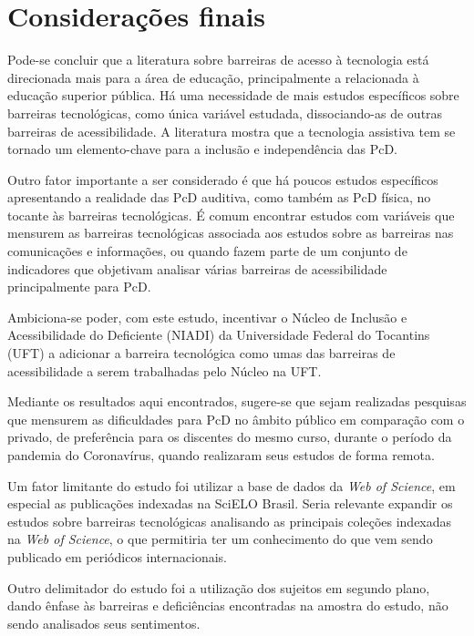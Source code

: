 \documentclass{textolivre}
\begin{document}
\section{Considerações finais}
Pode-se concluir que a literatura sobre barreiras de acesso à tecnologia está direcionada mais para a área de educação, principalmente a relacionada à educação superior pública. Há uma necessidade de mais estudos específicos sobre barreiras tecnológicas, como única variável estudada, dissociando-as de outras barreiras de acessibilidade. A literatura mostra que a tecnologia assistiva tem se tornado um elemento-chave para a inclusão e independência das PcD.

Outro fator importante a ser considerado é que há poucos estudos específicos apresentando a realidade das PcD auditiva, como também as PcD física, no tocante às barreiras tecnológicas. É comum encontrar estudos com variáveis que mensurem as barreiras tecnológicas associada aos estudos sobre as barreiras nas comunicações e informações, ou quando fazem parte de um conjunto de indicadores que objetivam analisar várias barreiras de acessibilidade principalmente para PcD.

Ambiciona-se poder, com este estudo, incentivar o Núcleo de Inclusão e Acessibilidade do Deficiente (NIADI) da Universidade Federal do Tocantins (UFT) a adicionar a barreira tecnológica como umas das barreiras de acessibilidade a serem trabalhadas pelo Núcleo na UFT.

Mediante os resultados aqui encontrados, sugere-se que sejam realizadas pesquisas que mensurem as dificuldades para PcD no âmbito público em comparação com o privado, de preferência para os discentes do mesmo curso, durante o período da pandemia do Coronavírus, quando realizaram seus estudos de forma remota.

Um fator limitante do estudo foi utilizar a base de dados da \emph{Web of Science}, em especial as publicações indexadas na SciELO Brasil. Seria relevante expandir os estudos sobre barreiras tecnológicas analisando as principais coleções indexadas na \emph{Web of Science}, o que permitiria ter um conhecimento do que vem sendo publicado em periódicos internacionais.

Outro delimitador do estudo foi a utilização dos sujeitos em segundo plano, dando ênfase às barreiras e deficiências encontradas na amostra do estudo, não sendo analisados seus sentimentos.



\printbibliography\label{sec-bib}
\end{document}
